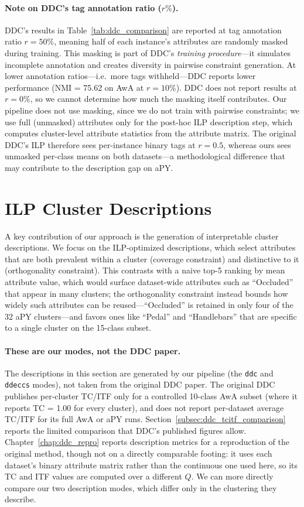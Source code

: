 \paragraph{Note on DDC's tag annotation ratio ($r\%$).} DDC's results in Table~\ref{tab:ddc_comparison} are reported at tag annotation ratio $r = 50\%$, meaning half of each instance's attributes are randomly masked during training. This masking is part of DDC's \emph{training procedure}---it simulates incomplete annotation and creates diversity in pairwise constraint generation. At lower annotation ratios---i.e.\ more tags withheld---DDC reports lower performance (NMI = 75.62 on AwA at $r = 10\%$). DDC does not report results at $r = 0\%$, so we cannot determine how much the masking itself contributes. Our pipeline does not use masking, since we do not train with pairwise constraints; we use full (unmasked) attributes only for the post-hoc ILP description step, which computes cluster-level attribute statistics from the attribute matrix. The original DDC's ILP therefore sees per-instance binary tags at $r = 0.5$, whereas ours sees unmasked per-class means on both datasets---a methodological difference that may contribute to the description gap on aPY.

\section{ILP Cluster Descriptions}
\label{sec:ilp_results}

A key contribution of our approach is the generation of interpretable cluster descriptions. We focus on the ILP-optimized descriptions, which select attributes that are both prevalent within a cluster (coverage constraint) and distinctive to it (orthogonality constraint). This contrasts with a naive top-5 ranking by mean attribute value, which would surface dataset-wide attributes such as ``Occluded'' that appear in many clusters; the orthogonality constraint instead bounds how widely such attributes can be reused---``Occluded'' is retained in only four of the 32 aPY clusters---and favors ones like ``Pedal'' and ``Handlebars'' that are specific to a single cluster on the 15-class subset.

\paragraph{These are our modes, not the DDC paper.} The descriptions in this section are generated by our pipeline (the \texttt{ddc} and \texttt{ddeccs} modes), not taken from the original DDC paper. The original DDC publishes per-cluster TC/ITF only for a controlled 10-class AwA subset (where it reports TC = 1.00 for every cluster), and does not report per-dataset average TC/ITF for its full AwA or aPY runs. Section~\ref{subsec:ddc_tcitf_comparison} reports the limited comparison that DDC's published figures allow. Chapter~\ref{chap:ddc_repro} reports description metrics for a reproduction of the original method, though not on a directly comparable footing: it uses each dataset's binary attribute matrix rather than the continuous one used here, so its TC and ITF values are computed over a different $Q$. We can more directly compare our two description modes, which differ only in the clustering they describe.

